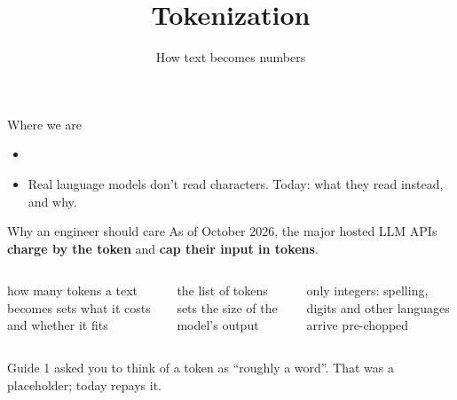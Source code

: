 \documentclass[aspectratio=169,11pt,t,\primeropts]{beamer}
\title{Tokenization}
\subtitle{How text becomes numbers}
\begin{document}
\begin{frame}
  \titlepage
\end{frame}

\begin{frame}{Where we are}
  \begin{center}\primerseriesmap\end{center}
  \vspace{2mm}
  \begin{itemize}
    \item {}
    \item Real language models don't read characters. Today: what they read instead, and why.
  \end{itemize}
\end{frame}

\begin{frame}{Why an engineer should care}
  As of October 2026, the major hosted LLM APIs \textbf{charge by the token} and \textbf{cap
  their input in tokens}.
  \vspace{4mm}
  \begin{columns}[T]
    \begin{keyidea}[Length]
      how many tokens a text becomes sets what it costs and whether it fits
    \end{keyidea}
    \begin{keyidea}[Vocabulary]
      the list of tokens sets the size of the model's output
    \end{keyidea}
    \begin{keyidea}
      only integers: spelling, digits and other languages arrive pre-chopped
    \end{keyidea}
  \end{columns}
  \vspace{4mm}
  Guide 1 asked you to think of a token as ``roughly a word''. That was a placeholder; today
  repays it.
\end{frame}
\end{document}

